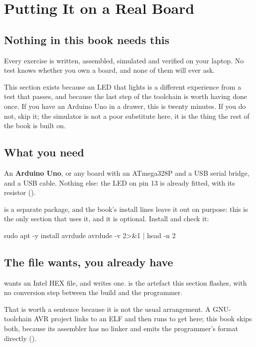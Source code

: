 
\section{Putting It on a Real Board}
\label{c2:sec:board}

\subsection{Nothing in this book needs this}
\label{c2:sec:optional}
Every exercise is written, assembled, simulated and verified on your laptop. No test knows whether
you own a board, and none of them will ever ask.

This section exists because an LED that lights is a different experience from a test that passes,
and because the last step of the toolchain is worth having done once. If you have an Arduino Uno in
a drawer, this is twenty minutes. If you do not, skip it; the simulator is not a poor substitute
here, it is the thing the rest of the book is built on.

\subsection{What you need}
\label{c2:sec:need}
An \textbf{Arduino Uno}, or any board with an ATmega328P and a USB serial bridge, and a USB cable.
Nothing else: the LED on pin 13 is already fitted, with its resistor ().

 is a separate package, and the book's install lines leave it out on purpose: this is
the only section that uses it, and it is optional. Install and check it:

\begin{shell}
sudo apt -y install avrdude
avrdude -v 2>&1 | head -n 2
\end{shell}

\subsection{The file  wants, you already have}
\label{c2:sec:hexfile}
 wants an Intel HEX file, and  writes one.  is
the artefact this section flashes, with no conversion step between the build and the programmer.

That is worth a sentence because it is not the usual arrangement. A GNU-toolchain AVR project links
to an ELF and then runs  to get here; this book skips both, because its
assembler has no linker and emits the programmer's format directly ().

